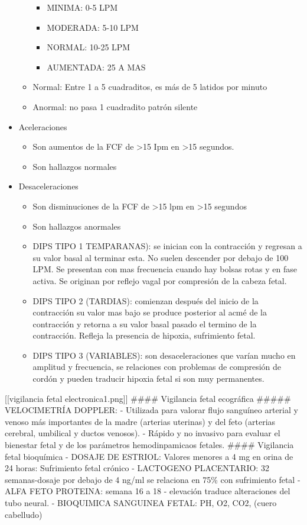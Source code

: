 \documentclass[
]{article}
\providecommand{\tightlist}{%
  \setlength{\itemsep}{0pt}\setlength{\parskip}{0pt}}
\begin{document}
\begin{itemize}
\begin{itemize}
    \begin{itemize}
    \tightlist
    \item
      MINIMA: 0-5 LPM
    \item
      MODERADA: 5-10 LPM
    \item
      NORMAL: 10-25 LPM
    \item
      AUMENTADA: 25 A MAS
    \end{itemize}
  \item
    Normal: Entre 1 a 5 cuadraditos, es más de 5 latidos por minuto
  \item
    Anormal: no pasa 1 cuadradito patrón silente
  \end{itemize}
\item
  Aceleraciones

  \begin{itemize}
  \tightlist
  \item
    Son aumentos de la FCF de \textgreater15 Ipm en \textgreater15
    segundos.
  \item
    Son hallazgos normales
  \end{itemize}
\item
  Desaceleraciones

  \begin{itemize}
  \tightlist
  \item
    Son disminuciones de la FCF de \textgreater15 lpm en \textgreater15
    segundos
  \item
    Son hallazgos anormales
  \item
    DIPS TIPO 1 TEMPARANAS): se inician con la contracción y regresan a
    su valor basal al terminar esta. No suelen descender por debajo de
    100 LPM. Se presentan con mas frecuencia cuando hay bolsas rotas y
    en fase activa. Se originan por reflejo vagal por compresión de la
    cabeza fetal.
  \item
    DIPS TIPO 2 (TARDIAS): comienzan después del inicio de la
    contracción su valor mas bajo se produce posterior al acmé de la
    contracción y retorna a su valor basal pasado el termino de la
    contracción. Refleja la presencia de hipoxia, sufrimiento fetal.
  \item
    DIPS TIPO 3 (VARIABLES): son desaceleraciones que varían mucho en
    amplitud y frecuencia, se relaciones con problemas de compresión de
    cordón y pueden traducir hipoxia fetal si son muy permanentes.
  \end{itemize}
\end{itemize}

{[}{[}vigilancia fetal electronica1.png{]}{]} \#\#\#\# Vigilancia fetal
ecográfica \#\#\#\#\# VELOCIMETRÍA DOPPLER: - Utilizada para valorar
flujo sanguíneo arterial y venoso más importantes de la madre (arterias
uterinas) y del feto (arterias cerebral, umbilical y ductos venosos). -
Rápido y no invasivo para evaluar el bienestar fetal y de los parámetros
hemodinpamicaos fetales. \#\#\#\# Vigilancia fetal bioquímica - DOSAJE
DE ESTRIOL: Valores menores a 4 mg en orina de 24 horas: Sufrimiento
fetal crónico - LACTOGENO PLACENTARIO: 32 semanas-dosaje por debajo de 4
ng/ml se relaciona en 75\% con sufrimiento fetal - ALFA FETO PROTEINA:
semana 16 a 18 - elevación traduce alteraciones del tubo neural. -
BIOQUIMICA SANGUINEA FETAL: PH, O2, CO2, (cuero cabelludo)
\end{document}

